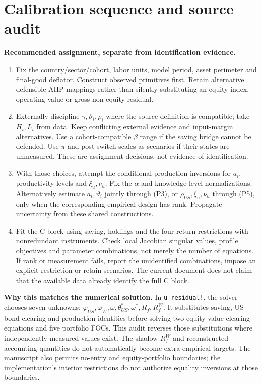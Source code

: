 \documentclass[10pt,a4paper,landscape]{article}
\begin{document}
\clearpage
\section{Calibration sequence and source audit}
\textbf{Recommended assignment, separate from identification evidence.}
\begin{enumerate}
\item Fix the country/sector/cohort, labor units, model period, asset perimeter and final-good deflator. Construct observed primitives first. Retain alternative defensible AHP mappings rather than silently substituting an equity index, operating value or gross non-equity residual.
\item Externally discipline $\gamma,\vartheta_i,\rho_i$ where the source definition is compatible; take $H_i,L_i$ from data. Keep conflicting external evidence and input-margin alternatives. Use a cohort-compatible $\beta$ range if the saving bridge cannot be defended. Use $\pi$ and post-switch scales as scenarios if their states are unmeasured. These are assignment decisions, not evidence of identification.
\item With those choices, attempt the conditional production inversions for $a_i$, productivity levels and $\xi_u,\nu_u$. Fix the $\alpha$ and knowledge-level normalizations. Alternatively estimate $a_i,\vartheta_i$ jointly through (P3), or $\rho_{US},\xi_u,\nu_u$ through (P5), only when the corresponding empirical design has rank. Propagate uncertainty from these shared constructions.
\item Fit the C block using saving, holdings and the four return restrictions with nonredundant instruments. Check local Jacobian singular values, profile objectives and parameter combinations, not merely the number of equations. If rank or measurement fails, report the unidentified combinations, impose an explicit restriction or retain scenarios. The current document does not claim that the available data already identify the full C block.
\end{enumerate}
\textbf{Why this matches the numerical solution.} In \texttt{u\_residual!}, the solver chooses seven unknowns: $\varphi_{US},\varphi_W,\omega,\theta^*_{US},\omega^*,R_f,R_f^W$. It substitutes saving, US bond clearing and production identities before solving two equity-value-clearing equations and five portfolio FOCs. This audit reverses those substitutions where independently measured values exist. The shadow $R_f^W$ and reconstructed accounting quantities do not automatically become extra empirical targets. The manuscript also permits no-entry and equity-portfolio boundaries; the implementation's interior restrictions do not authorize equality inversions at those boundaries.
\end{document}
